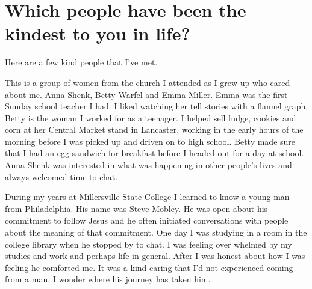\section{Which people have been the kindest to you in life?}
Here are a few kind people that I've met.

This is a group of women from the church I attended as I grew up who cared about me.
Anna Shenk, Betty Warfel and Emma Miller.
Emma was the first Sunday school teacher I had.
I liked watching her tell stories with a flannel graph.
Betty is the woman I worked for as a teenager.
I helped sell fudge, cookies and corn at her Central Market stand in Lancaster, working in the early hours of the morning before I was picked up and driven on to high school.
Betty made sure that I had an egg sandwich for breakfast before I headed out for a day at school.
Anna Shenk was interested in what was happening in other people's lives and always welcomed time to chat.

 During my years at Millersville State College I learned to know a young man from Philadelphia.
His name was Steve Mobley.
He was open about his commitment to follow Jesus and he often initiated conversations with people about the meaning of that commitment.
One day I was studying in a room in the college library when he stopped by to chat.
I was feeling over whelmed by my studies and work and perhaps life in general.
After I was honest about how I was feeling he comforted me.
It was a kind caring that I'd not experienced coming from a man.
I wonder where his journey has taken him.






